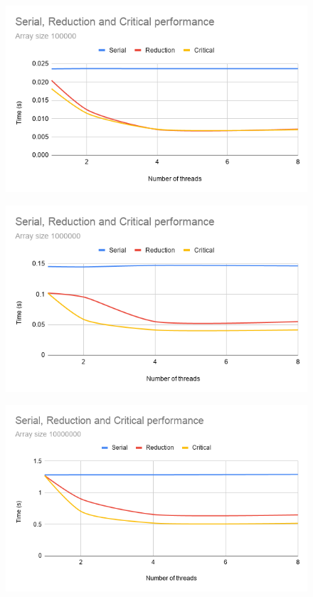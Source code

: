 \documentclass[unicode,11pt,a4paper,oneside,numbers=endperiod,openany]{scrartcl}
\begin{document}
\begin{enumerate}
        \begin{figure}[H]
            \centering
            \includegraphics[width=0.9\linewidth]{"Serial, Reduction and Critical Performance-5"}
        \end{figure}

        \begin{figure}[H]
            \centering
            \includegraphics[width=0.9\linewidth]{"Serial, Reduction and Critical Performance-6"}
        \end{figure}

        \begin{figure}[H]
            \centering
            \includegraphics[width=0.9\linewidth]{"Serial, Reduction and Critical Performance-7"}
        \end{figure}


\end{enumerate}
\end{document}

